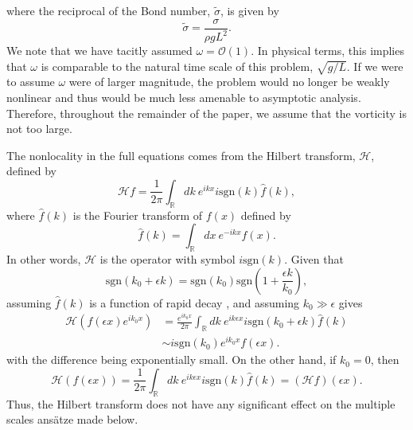 \documentclass{JFM_Style/jfm}
\begin{document}
where the reciprocal of the Bond number, $\tilde{\sigma}$, is given by
\[
\tilde{\sigma} = \frac{\sigma}{\rho g L^2}.
\]
We note that we have tacitly assumed $\omega = \mathcal{O}(1)$.  In physical terms, this implies that $\omega$ is comparable to the natural time scale of this problem, $\sqrt{g/L}$.  If we were to assume $\omega$ were of larger magnitude, the problem would no longer be weakly nonlinear and thus would be much less amenable to asymptotic analysis.  Therefore, throughout the remainder of the paper, we assume that the vorticity is not too large.

The nonlocality in the full equations comes from the Hilbert transform, $\mathcal{H}$, defined by 
\[
\mathcal{H}f = \frac{1}{2\pi}\int_{\mathbb{R}}dk~ e^{ikx}  i\mbox{sgn}(k) \hat{f}(k),
\]
where $\hat{f}(k)$ is the Fourier transform of $f(x)$ defined by
\[
\hat{f}(k) = \int_{\mathbb{R}}dx~ e^{-ikx}f(x).
\]
In other words, $\mathcal{H}$ is the operator with symbol $i\mbox{sgn}(k)$.  Given that 
\[
\mbox{sgn}(k_{0} + \epsilon k) = \mbox{sgn}(k_{0})\mbox{sgn}\left( 1 + \frac{\epsilon k}{k_{0}}\right),
\] 
assuming $\hat{f}(k)$ is a function of rapid decay \cite{folland},  and assuming $k_{0}\gg \epsilon$ gives 
\begin{align}
\mathcal{H}\left( f(\epsilon x) e^{ik_{0}x} \right)& =
\frac{e^{ik_{0}x}}{2\pi}\int_{\mathbb{R}}dk~ e^{ik\epsilon x}
i\mbox{sgn}(k_{0}+\epsilon k) \hat{f}(k)\nonumber \\ & \sim i\mbox{sgn}(k_{0})e^{ik_{0}x}f(\epsilon x).\nonumber
\end{align}
with the difference being exponentially small.  On the other hand, if $k_{0}=0$, then 
\[
\mathcal{H}\left( f(\epsilon x) \right) = \frac{1}{2\pi}\int_{\mathbb{R}}dk~ e^{ik\epsilon x}  i\mbox{sgn}(k) \hat{f}(k) = (\mathcal{H}f)(\epsilon x). 
\]
Thus, the Hilbert transform does not have any significant effect on the multiple scales ans\"{a}tze made below.  
\end{document}
